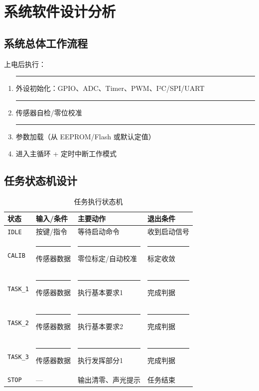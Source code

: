 \documentclass[12pt,a4paper,fontset=fandol]{ctexart}
\newcommand{\code}[1]{\texttt{\small #1}}
\newcommand{\blank}{\rule{4cm}{0.4pt}}
\begin{document}
\section{系统软件设计分析}

\subsection{系统总体工作流程}
上电后执行：
\begin{enumerate}
  \item \blank{外设初始化：GPIO、ADC、Timer、PWM、I²C/SPI/UART}
  \item \blank{传感器自检/零位校准}
  \item \blank{参数加载（从 EEPROM/Flash 或默认定值）}
  \item 进入主循环 + 定时中断工作模式
\end{enumerate}


\subsection{任务状态机设计}

\begin{table}[H]
\centering
\caption{任务执行状态机}
\begin{tabularx}{\textwidth}{p{2.6cm}p{2.5cm}Yp{2.7cm}}
\toprule
状态 & 输入/条件 & 主要动作 & 退出条件\\
\midrule
\code{IDLE}     & 按键/指令 & 等待启动命令 & 收到启动信号\\
\code{CALIB}    & \blank{传感器数据} & \blank{零位标定/自动校准} & \blank{标定收敛}\\
\code{TASK\_1}  & \blank{传感器数据} & \blank{执行基本要求1} & \blank{完成判据}\\
\code{TASK\_2}  & \blank{传感器数据} & \blank{执行基本要求2} & \blank{完成判据}\\
\code{TASK\_3}  & \blank{传感器数据} & \blank{执行发挥部分1} & \blank{完成判据}\\
\code{STOP}     & — & 输出清零、声光提示 & 任务结束\\
\bottomrule
\end{tabularx}
\end{table}
\end{document}

